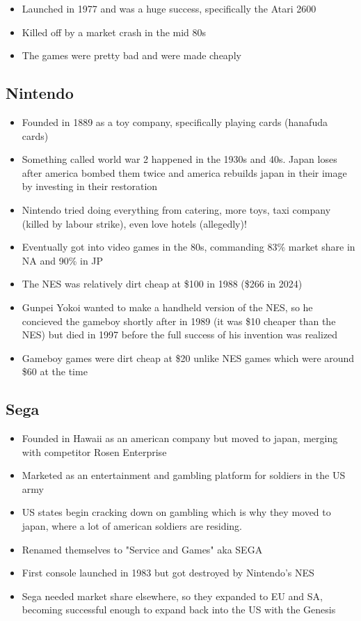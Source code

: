 \documentclass[12pt]{book}
\begin{document}
\begin{itemize}
    \item Launched in 1977 and was a huge success, specifically the Atari 2600
    \item Killed off by a market crash in the mid 80s
    \item The games were pretty bad and were made cheaply
\end{itemize}

\subsection{Nintendo}

\begin{itemize}
    \item Founded in 1889 as a toy company, specifically playing cards (hanafuda cards)
    \item Something called world war 2 happened in the 1930s and 40s. Japan loses after america bombed them twice and america rebuilds japan in their image by investing in their restoration
    \item Nintendo tried doing everything from catering, more toys, taxi company (killed by labour strike), even love hotels (allegedly)!
    \item Eventually got into video games in the 80s, commanding 83\% market share in NA and 90\% in JP
    \item The NES was relatively dirt cheap at \$100 in 1988 (\$266 in 2024)
    \item Gunpei Yokoi wanted to make a handheld version of the NES, so he concieved the gameboy shortly after in 1989 (it was \$10 cheaper than the NES) but died in 1997 before the full success of his invention was realized
    \item Gameboy games were dirt cheap at \$20 unlike NES games which were around \$60 at the time
\end{itemize}

\subsection{Sega}

\begin{itemize}
    \item Founded in Hawaii as an american company but moved to japan, merging with competitor Rosen Enterprise
    \item Marketed as an entertainment and gambling platform for soldiers in the US army
    \item US states begin cracking down on gambling which is why they moved to japan, where a lot of american soldiers are residing.
    \item Renamed themselves to "Service and Games" aka SEGA
    \item First console launched in 1983 but got destroyed by Nintendo's NES
    \item Sega needed market share elsewhere, so they expanded to EU and SA, becoming successful enough to expand back into the US with the Genesis
\end{itemize}
\end{document}

